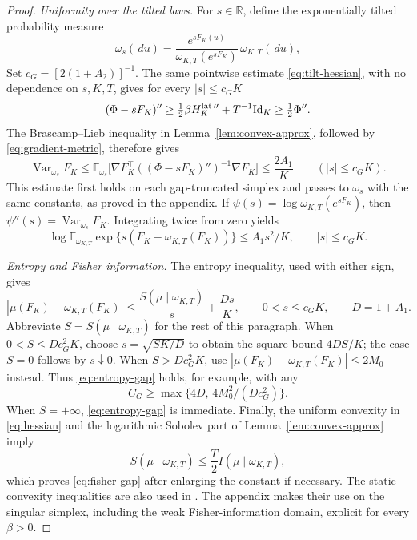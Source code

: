 \documentclass[11pt,reqno]{amsart}
\numberwithin{equation}{section}
\theoremstyle{definition}
\theoremstyle{remark}
\newcommand{\R}{\mathbb R}
\newcommand{\E}{\mathbb E}
\newcommand{\1}{\mathbf 1}
\newcommand{\Var}{\operatorname{Var}}
\newcommand{\Id}{\mathrm{Id}}
\newcommand{\dd}{\,d}
\begin{document}
\begin{proof}
\smallskip\noindent\textit{Uniformity over the tilted laws.}
For $s\in\R$, define the exponentially tilted probability measure
\[
\omega_s(\dd u)=
\frac{e^{sF_K(u)}}{\omega_{K,T}(e^{sF_K})}\,\omega_{K,T}(\dd u),
\]
Set $c_G=[2(1+A_2)]^{-1}$. The same pointwise estimate
\eqref{eq:tilt-hessian}, with no dependence on $s,K,T$, gives
for every $|s|\le c_GK$
\[
(\Phi-sF_K)''
\ge\tfrac12\beta H_K^{{\rm lat}\,\prime\prime}+T^{-1}\Id_K
\ge\tfrac12\Phi''.
\]
The Brascamp--Lieb inequality in Lemma~\ref{lem:convex-approx},
followed by \eqref{eq:gradient-metric}, therefore gives
\[
\Var_{\omega_s}F_K
\le\E_{\omega_s}\bigl[
\nabla F_K^\top((\Phi-sF_K)'')^{-1}\nabla F_K\bigr]
\le\frac{2A_1}{K}
\qquad(|s|\le c_GK).
\]
This estimate first holds on each gap-truncated simplex and passes
to $\omega_s$ with the same constants, as proved in the appendix.
If $\psi(s)=\log\omega_{K,T}(e^{sF_K})$, then
$\psi''(s)=\Var_{\omega_s}F_K$. Integrating twice from zero yields
\begin{equation}\label{eq:mgf}
\log\E_{\omega_{K,T}}
\exp\{s(F_K-\omega_{K,T}(F_K))\}
\le A_1s^2/K,\qquad |s|\le c_GK.
\end{equation}

\smallskip\noindent\textit{Entropy and Fisher information.}
The entropy inequality, used with either sign, gives
\[
|\mu(F_K)-\omega_{K,T}(F_K)|
\le\frac{S(\mu\mid\omega_{K,T})}{s}+\frac{D s}{K},
\qquad 0<s\le c_GK,\qquad D=1+A_1.
\]
Abbreviate $S=S(\mu\mid\omega_{K,T})$ for the rest of this paragraph.
When $0<S\le Dc_G^2K$, choose $s=\sqrt{SK/D}$ to obtain the
square bound $4DS/K$; the case $S=0$ follows by $s\downarrow0$.
When $S>Dc_G^2K$, use
$|\mu(F_K)-\omega_{K,T}(F_K)|\le2M_0$ instead.
Thus \eqref{eq:entropy-gap} holds, for example, with any
\[
C_G\ge\max\{4D,\,4M_0^2/(Dc_G^2)\}.
\]
When $S=+\infty$, \eqref{eq:entropy-gap} is immediate.
Finally, the uniform convexity in \eqref{eq:hessian} and the
logarithmic Sobolev part of Lemma~\ref{lem:convex-approx} imply
\begin{equation}\label{eq:lsi}
S(\mu\mid\omega_{K,T})\le\frac T2 I(\mu\mid\omega_{K,T}),
\end{equation}
which proves \eqref{eq:fisher-gap} after enlarging the constant if
necessary. The static convexity inequalities are also used in
\cite[Sections~3 and 5]{BEY}. The appendix makes their use on the
singular simplex, including the weak Fisher-information domain,
explicit for every $\beta>0$.
\end{proof}
\end{document}
